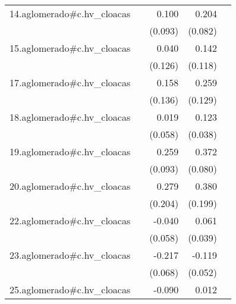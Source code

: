 {\begin{longtable}{l*{4}{D{.}{.}{-1}}}
\addlinespace
14.aglomerado#c.hv\_cloacas&                     &       0.100         &       0.204\sym{*}  &                     \\
            &                     &     (0.093)         &     (0.082)         &                     \\
\addlinespace
15.aglomerado#c.hv\_cloacas&                     &       0.040         &       0.142         &                     \\
            &                     &     (0.126)         &     (0.118)         &                     \\
\addlinespace
17.aglomerado#c.hv\_cloacas&                     &       0.158         &       0.259\sym{*}  &                     \\
            &                     &     (0.136)         &     (0.129)         &                     \\
\addlinespace
18.aglomerado#c.hv\_cloacas&                     &       0.019         &       0.123\sym{**} &                     \\
            &                     &     (0.058)         &     (0.038)         &                     \\
\addlinespace
19.aglomerado#c.hv\_cloacas&                     &       0.259\sym{**} &       0.372\sym{***}&                     \\
            &                     &     (0.093)         &     (0.080)         &                     \\
\addlinespace
20.aglomerado#c.hv\_cloacas&                     &       0.279         &       0.380         &                     \\
            &                     &     (0.204)         &     (0.199)         &                     \\
\addlinespace
22.aglomerado#c.hv\_cloacas&                     &      -0.040         &       0.061         &                     \\
            &                     &     (0.058)         &     (0.039)         &                     \\
\addlinespace
23.aglomerado#c.hv\_cloacas&                     &      -0.217\sym{**} &      -0.119\sym{*}  &                     \\
            &                     &     (0.068)         &     (0.052)         &                     \\
\addlinespace
25.aglomerado#c.hv\_cloacas&                     &      -0.090         &       0.012         &                     \\

\end{longtable}}
